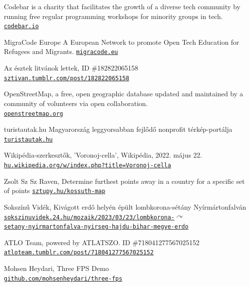 \documentclass[a5paper,10pt]{article}
\begin{document}
\begin{thebibliography}{99}

 Codebar is a charity that facilitates the growth of a diverse tech community by running free regular programming workshops for minority groups in tech. \href{https://codebar.io}{\texttt{codebar.io}}

 MigraCode Europe A European Network to promote Open Tech Education for Refugees and Migrants. \href{https://migracode.eu}{\texttt{migracode.eu}}

 Az észtek litvánok lettek, ID \#182822065158 \\
\href{https://sztivan.tumblr.com/post/182822065158}{\texttt{sztivan.tumblr.com/post/182822065158}}

 OpenStreetMap, a free, open geographic database updated and maintained by a community of volunteers via open collaboration. \\
\href{https://openstreetmap.org}{\texttt{openstreetmap.org}}

 turistautak.hu Magyarország leggyorsabban fejlődő nonprofit térkép-portálja
\href{https://turistautak.hu}{\texttt{turistautak.hu}}

 Wikipédia-szerkesztők, 'Voronoj-cella', Wikipédia, 2022. május 22. \\
\href{https://hu.wikipedia.org/w/index.php?title=Voronoj-cella&oldid=24947920}{\texttt{hu.wikipedia.org/w/index.php?title=Voronoj-cella}}

 Zsolt Sz Sz Raven, Determine furthest points away in a country for a specific set of points
\href{https://sztupy.hu/kossuth-map/}{\texttt{sztupy.hu/kossuth-map}}

 Sokszínű Vidék, Kivágott erdő helyén épült lombkorona-sétány Nyírmártonfalván \\
\href{https://sokszinuvidek.24.hu/mozaik/2023/03/23/lombkorona-setany-nyirmartonfalva-nyirseg-hajdu-bihar-megye-erdo/}{\texttt{sokszinuvidek.24.hu/mozaik/2023/03/23/lombkorona-}$\curvearrowright$\\\texttt{setany-nyirmartonfalva-nyirseg-hajdu-bihar-megye-erdo}}

 ATLO Team, powered by ATLATSZO. ID \#718041277567025152 \\
\href{https://atloteam.tumblr.com/post/718041277567025152}{\texttt{atloteam.tumblr.com/post/718041277567025152}}

 Mohsen Heydari, Three FPS Demo \\
\href{https://github.com/mohsenheydari/three-fps}{\texttt{github.com/mohsenheydari/three-fps}}


\end{thebibliography}
\end{document}
